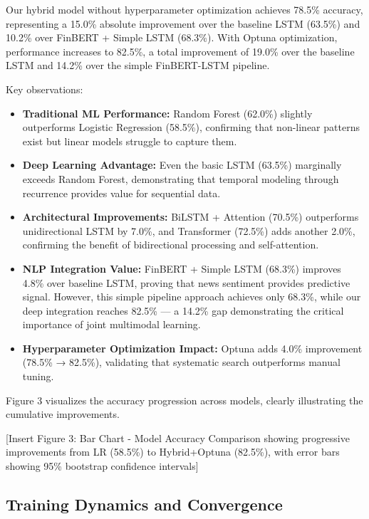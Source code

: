 \documentclass[conference]{IEEEtran}
\begin{document}
Our hybrid model without hyperparameter optimization achieves 78.5\% accuracy, representing a 15.0\% absolute improvement over the baseline LSTM (63.5\%) and 10.2\% over FinBERT + Simple LSTM (68.3\%). With Optuna optimization, performance increases to 82.5\%, a total improvement of 19.0\% over the baseline LSTM and 14.2\% over the simple FinBERT-LSTM pipeline.

Key observations:

\begin{itemize}
\item \textbf{Traditional ML Performance:} Random Forest (62.0\%) slightly outperforms Logistic Regression (58.5\%), confirming that non-linear patterns exist but linear models struggle to capture them.

\item \textbf{Deep Learning Advantage:} Even the basic LSTM (63.5\%) marginally exceeds Random Forest, demonstrating that temporal modeling through recurrence provides value for sequential data.

\item \textbf{Architectural Improvements:} BiLSTM + Attention (70.5\%) outperforms unidirectional LSTM by 7.0\%, and Transformer (72.5\%) adds another 2.0\%, confirming the benefit of bidirectional processing and self-attention.

\item \textbf{NLP Integration Value:} FinBERT + Simple LSTM (68.3\%) improves 4.8\% over baseline LSTM, proving that news sentiment provides predictive signal. However, this simple pipeline approach achieves only 68.3\%, while our deep integration reaches 82.5\% — a 14.2\% gap demonstrating the critical importance of joint multimodal learning.

\item \textbf{Hyperparameter Optimization Impact:} Optuna adds 4.0\% improvement (78.5\% → 82.5\%), validating that systematic search outperforms manual tuning.
\end{itemize}

Figure 3 visualizes the accuracy progression across models, clearly illustrating the cumulative improvements.

[Insert Figure 3: Bar Chart - Model Accuracy Comparison showing progressive improvements from LR (58.5\%) to Hybrid+Optuna (82.5\%), with error bars showing 95\% bootstrap confidence intervals]

\subsection{Training Dynamics and Convergence}
\end{document}
